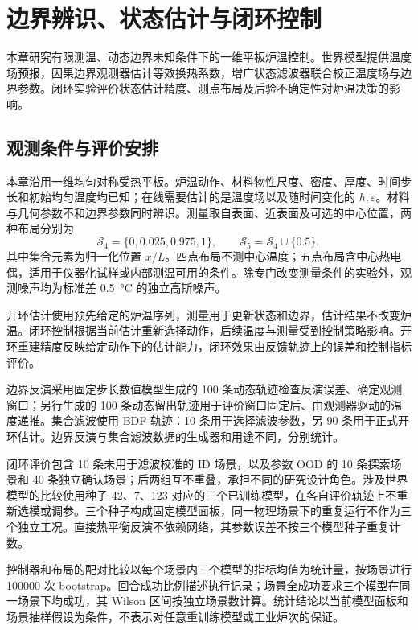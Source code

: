 \chapter{边界辨识、状态估计与闭环控制}

本章研究有限测温、动态边界未知条件下的一维平板炉温控制。世界模型提供温度场预报，因果边界观测器估计等效换热系数，增广状态滤波器联合校正温度场与边界参数。闭环实验评价状态估计精度、测点布局及后验不确定性对炉温决策的影响。

\section{观测条件与评价安排}

本章沿用一维均匀对称受热平板。炉温动作、材料物性尺度、密度、厚度、时间步长和初始均匀温度均已知；在线需要估计的是温度场以及随时间变化的 $h,\varepsilon$。材料与几何参数不和边界参数同时辨识。测量取自表面、近表面及可选的中心位置，两种布局分别为
\begin{equation}
  \mathcal{S}_4=\{0,0.025,0.975,1\},\qquad
  \mathcal{S}_5=\mathcal{S}_4\cup\{0.5\},
  \label{eq:sensor_layouts}
\end{equation}
其中集合元素为归一化位置 $x/L$。四点布局不测中心温度；五点布局含中心热电偶，适用于仪器化试样或内部测温可用的条件。除专门改变测量条件的实验外，观测噪声均为标准差 \SI{0.5}{\degreeCelsius} 的独立高斯噪声。

开环估计使用预先给定的炉温序列，测量用于更新状态和边界，估计结果不改变炉温。闭环控制根据当前估计重新选择动作，后续温度与测量受到控制策略影响。开环重建精度反映给定动作下的估计能力，闭环效果由反馈轨迹上的误差和控制指标评价。

边界反演采用固定步长数值模型生成的 100 条动态轨迹检查反演误差、确定观测窗口；另行生成的 100 条动态留出轨迹用于评价窗口固定后、由观测器驱动的温度递推。集合滤波使用 BDF 轨迹：10 条用于选择滤波参数，另 90 条用于正式开环估计。边界反演与集合滤波数据的生成器和用途不同，分别统计。

闭环评价包含 10 条未用于滤波校准的 ID 场景，以及参数 OOD 的 10 条探索场景和 40 条独立确认场景；后两组互不重叠，承担不同的研究设计角色。涉及世界模型的比较使用种子 42、7、123 对应的三个已训练模型，在各自评价轨迹上不重新选模或调参。三个种子构成固定模型面板，同一物理场景下的重复运行不作为三个独立工况。直接热平衡反演不依赖网络，其参数误差不按三个模型种子重复计数。

控制器和布局的配对比较以每个场景内三个模型的指标均值为统计量，按场景进行 100000 次 bootstrap。回合成功比例描述执行记录；场景全成功要求三个模型在同一场景下均成功，其 Wilson 区间按独立场景数计算。统计结论以当前模型面板和场景抽样假设为条件，不表示对任意重训练模型或工业炉次的保证。

